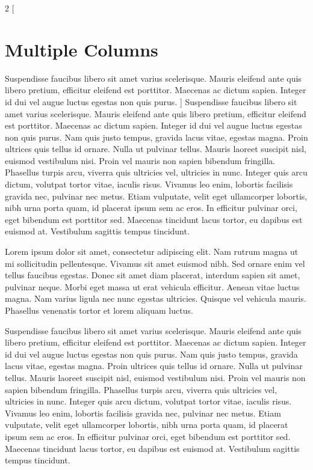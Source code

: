 \begin{multicols}{2}
[
\section{Multiple Columns}
Suspendisse faucibus libero sit amet varius scelerisque. Mauris eleifend ante quis libero pretium, efficitur eleifend est porttitor. Maecenas ac dictum sapien. Integer id dui vel augue luctus egestas non quis purus.
]
Suspendisse faucibus libero sit amet varius scelerisque. Mauris eleifend ante quis libero pretium, efficitur eleifend est porttitor. Maecenas ac dictum sapien. Integer id dui vel augue luctus egestas non quis purus. Nam quis justo tempus, gravida lacus vitae, egestas magna. Proin ultrices quis tellus id ornare. Nulla ut pulvinar tellus. Mauris laoreet suscipit nisl, euismod vestibulum nisi. Proin vel mauris non sapien bibendum fringilla. Phasellus turpis arcu, viverra quis ultricies vel, ultricies in nunc. Integer quis arcu dictum, volutpat tortor vitae, iaculis risus. Vivamus leo enim, lobortis facilisis gravida nec, pulvinar nec metus. Etiam vulputate, velit eget ullamcorper lobortis, nibh urna porta quam, id placerat ipsum sem ac eros. In efficitur pulvinar orci, eget bibendum est porttitor sed. Maecenas tincidunt lacus tortor, eu dapibus est euismod at. Vestibulum sagittis tempus tincidunt. 

Lorem ipsum dolor sit amet, consectetur adipiscing elit. Nam rutrum magna ut mi sollicitudin pellentesque. Vivamus sit amet euismod nibh. Sed ornare enim vel tellus faucibus egestas. Donec sit amet diam placerat, interdum sapien sit amet, pulvinar neque. Morbi eget massa ut erat vehicula efficitur. Aenean vitae luctus magna. Nam varius ligula nec nunc egestas ultricies. Quisque vel vehicula mauris. Phasellus venenatis tortor et lorem aliquam luctus.

\end{multicols}

Suspendisse faucibus libero sit amet varius scelerisque. Mauris eleifend ante quis libero pretium, efficitur eleifend est porttitor. Maecenas ac dictum sapien. Integer id dui vel augue luctus egestas non quis purus. Nam quis justo tempus, gravida lacus vitae, egestas magna. Proin ultrices quis tellus id ornare. Nulla ut pulvinar tellus. Mauris laoreet suscipit nisl, euismod vestibulum nisi. Proin vel mauris non sapien bibendum fringilla. Phasellus turpis arcu, viverra quis ultricies vel, ultricies in nunc. Integer quis arcu dictum, volutpat tortor vitae, iaculis risus. Vivamus leo enim, lobortis facilisis gravida nec, pulvinar nec metus. Etiam vulputate, velit eget ullamcorper lobortis, nibh urna porta quam, id placerat ipsum sem ac eros. In efficitur pulvinar orci, eget bibendum est porttitor sed. Maecenas tincidunt lacus tortor, eu dapibus est euismod at. Vestibulum sagittis tempus tincidunt. 

